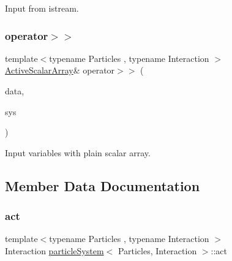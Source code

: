 Input from istream. 

\mbox{\label{classparticle_system_affbb0c2390b4b7179ea658e1de2a247e}} 
\subsubsection{\texorpdfstring{operator$>$$>$}{operator>>}\hspace{0.1cm}{\footnotesize\ttfamily [2/2]}}
{\footnotesize\ttfamily template$<$typename Particles , typename Interaction $>$ \\
\mbox{\hyperlink{classparticle_system_adeaa416917733980026d138dfde2f7ab}{Active\+Scalar\+Array}}\& operator$>$$>$ (\begin{DoxyParamCaption}\item[{\mbox{\hyperlink{classparticle_system_adeaa416917733980026d138dfde2f7ab}{Active\+Scalar\+Array}} \&}]{data,  }\item[{\mbox{\hyperlink{classparticle_system}{particle\+System}}$<$ Particles, Interaction $>$ \&}]{sys }\end{DoxyParamCaption})\hspace{0.3cm}{\ttfamily [friend]}}



Input variables with plain scalar array. 



\subsection{Member Data Documentation}
\mbox{\label{classparticle_system_a41e5c73bc46164302db25b5c5d28aedd}} 
\subsubsection{\texorpdfstring{act}{act}}
{\footnotesize\ttfamily template$<$typename Particles , typename Interaction $>$ \\
Interaction \mbox{\hyperlink{classparticle_system}{particle\+System}}$<$ Particles, Interaction $>$\+::act\hspace{0.3cm}{\ttfamily [protected]}}




